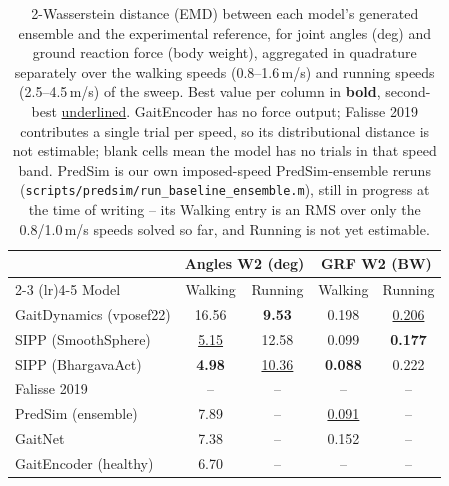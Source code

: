 \begin{table}[t]
\centering
\caption{2-Wasserstein distance (EMD) between each model's generated ensemble
and the experimental reference, for joint angles (deg) and ground reaction
force (body weight), aggregated in quadrature separately over the walking
speeds (0.8--1.6\,m/s) and running speeds (2.5--4.5\,m/s) of the sweep. Best
value per column in \textbf{bold}, second-best \underline{underlined}.
GaitEncoder has no force output; Falisse 2019 contributes a single trial per
speed, so its distributional distance is not estimable; blank cells mean the
model has no trials in that speed band. PredSim is our own imposed-speed
PredSim-ensemble reruns (\texttt{scripts/predsim/run\_baseline\_ensemble.m}),
still in progress at the time of writing -- its Walking entry is an RMS over
only the 0.8/1.0\,m/s speeds solved so far, and Running is not yet
estimable.}
\label{tab:emd_walk_run}
\begin{tabular}{lcccc}
\toprule
 & \multicolumn{2}{c}{Angles W2 (deg)} & \multicolumn{2}{c}{GRF W2 (BW)} \\
\cmidrule(lr){2-3} \cmidrule(lr){4-5}
Model & Walking & Running & Walking & Running \\
\midrule
GaitDynamics (vposef22)  & 16.56 & \textbf{9.53}  & 0.198 & \underline{0.206} \\
SIPP (SmoothSphere)      & \underline{5.15} & 12.58 & 0.099 & \textbf{0.177} \\
SIPP (BhargavaAct)       & \textbf{4.98} & \underline{10.36} & \textbf{0.088} & 0.222 \\
Falisse 2019             & --    & --             & --    & --    \\
PredSim (ensemble)       & 7.89  & --             & \underline{0.091} & --    \\
GaitNet                  & 7.38  & --             & 0.152 & --    \\
GaitEncoder (healthy)    & 6.70  & --             & --    & --    \\
\bottomrule
\end{tabular}
\end{table}

